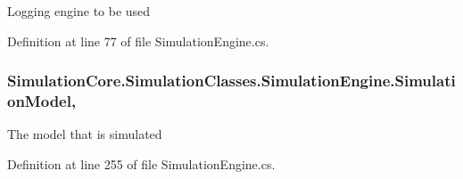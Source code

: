 Logging engine to be used 



Definition at line 77 of file Simulation\+Engine.\+cs.

\subsubsection[{\texorpdfstring{Simulation\+Model}{SimulationModel}}]{ Simulation\+Core.\+Simulation\+Classes.\+Simulation\+Engine.\+Simulation\+Model\hspace{0.3cm}{\ttfamily [get]}, {\ttfamily [set]}}\hypertarget{class_simulation_core_1_1_simulation_classes_1_1_simulation_engine_a9937fb2a8987f08182fe9019dd197f90}{}\label{class_simulation_core_1_1_simulation_classes_1_1_simulation_engine_a9937fb2a8987f08182fe9019dd197f90}


The model that is simulated 



Definition at line 255 of file Simulation\+Engine.\+cs.

